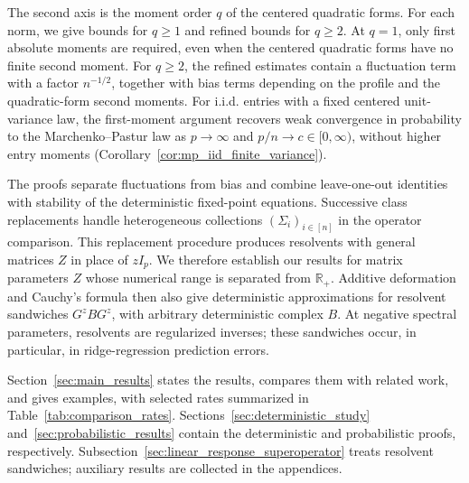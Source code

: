 \documentclass[EJP, preprint, NODS, nobera, nofontexpansion]{ejpecp}
\begin{document}
The second axis is the moment order $q$ of the centered quadratic forms.
For each norm, we give bounds for $q\geq1$ and refined bounds for $q\geq2$.
At $q=1$, only first absolute moments are required, even when the centered
quadratic forms have no finite second moment. 
For \(q\geq2\), the refined estimates contain a fluctuation term with a factor \(n^{-1/2}\), together with bias terms depending on the profile and the quadratic-form second moments.
For i.i.d. entries with a fixed centered unit-variance law, the first-moment argument recovers weak convergence in probability to the Marchenko–Pastur law as \(p\to\infty\) and \(p/n\to c\in[0,\infty)\), without higher entry moments (Corollary~\ref{cor:mp_iid_finite_variance}).

The proofs separate fluctuations from bias and combine leave-one-out
identities with stability of the deterministic fixed-point equations.
Successive class replacements handle heterogeneous collections
$(\Sigma_i)_{i\in[n]}$ in the operator comparison. This replacement procedure
produces resolvents with general matrices $Z$ in place of $zI_p$.
We therefore establish our results for matrix parameters $Z$ whose
numerical range is separated from $\mathbb R_+$. Additive
deformation and Cauchy's formula then also give deterministic
approximations for resolvent sandwiches $G^zBG^z$, with arbitrary
deterministic complex $B$. At negative spectral parameters, resolvents
are regularized inverses; these sandwiches occur, in particular, in
ridge-regression prediction errors.

Section~\ref{sec:main_results} states the results, compares them with
related work, and gives examples, with selected rates summarized in
Table~\ref{tab:comparison_rates}.
Sections~\ref{sec:deterministic_study} and~\ref{sec:probabilistic_results}
contain the deterministic and probabilistic proofs, respectively.
Subsection~\ref{sec:linear_response_superoperator} treats resolvent
sandwiches; auxiliary results are collected in the appendices.
\end{document}
